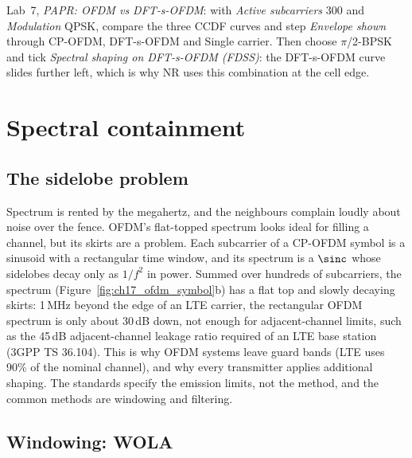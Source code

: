 \begin{tryit}
Lab~7, \emph{PAPR: OFDM vs DFT-s-OFDM}: with \emph{Active subcarriers} 300 and \emph{Modulation}
QPSK, compare the three CCDF curves and step \emph{Envelope shown} through CP-OFDM, DFT-s-OFDM and
Single carrier. Then choose $\pi$/2-BPSK and tick \emph{Spectral shaping on DFT-s-OFDM (FDSS)}: the
DFT-s-OFDM curve slides further left, which is why NR uses this combination at the cell edge.
\end{tryit}


\section{Spectral containment}
\label{sec:ch17:oob}

\subsection{The sidelobe problem}

Spectrum is rented by the megahertz, and the neighbours complain loudly about noise over the fence.
OFDM's flat-topped spectrum looks ideal for filling a channel, but its skirts are a problem. Each
subcarrier of a CP-OFDM symbol is a sinusoid with a rectangular time window, and its spectrum is a
$\sinc$ whose sidelobes decay only as $1/f^2$ in power. Summed over hundreds of subcarriers, the spectrum
(Figure~\ref{fig:ch17_ofdm_symbol}b) has a flat top and slowly decaying skirts: 1\,MHz beyond the edge of an LTE
carrier, the rectangular OFDM spectrum is only about 30\,dB down, not enough for adjacent-channel limits,
such as the 45\,dB adjacent-channel leakage ratio required of an LTE base station (3GPP TS 36.104). This is why
OFDM systems leave guard bands (LTE uses 90\% of the nominal channel), and why every transmitter applies
additional shaping. The standards specify the emission limits, not the method, and the common methods are
windowing and filtering.

\subsection{Windowing: WOLA}

